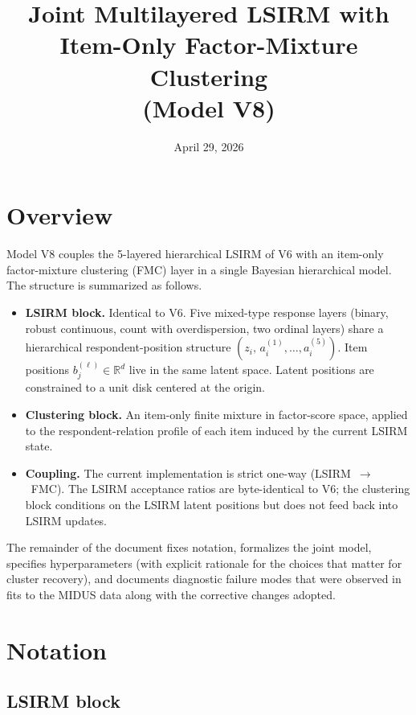 \documentclass[11pt]{article}
\title{Joint Multilayered LSIRM with Item-Only Factor-Mixture Clustering\\
(Model V8)}
\date{April 29, 2026}
\begin{document}
\maketitle

\section{Overview}

Model V8 couples the 5-layered hierarchical LSIRM of V6 with an item-only
factor-mixture clustering (FMC) layer in a single Bayesian hierarchical model.
The structure is summarized as follows.
\begin{itemize}[leftmargin=1.5em]
    \item \textbf{LSIRM block.} Identical to V6.
        Five mixed-type response layers (binary, robust continuous, count with overdispersion, two ordinal layers) share a hierarchical respondent-position structure $(z_i,\,a_i^{(1)},\dots,a_i^{(5)})$.
        Item positions $b_j^{(\ell)}\in\mathbb{R}^d$ live in the same latent space.
        Latent positions are constrained to a unit disk centered at the origin.
    \item \textbf{Clustering block.} An item-only finite mixture in factor-score
        space, applied to the respondent-relation profile of each item induced
        by the current LSIRM state.
    \item \textbf{Coupling.} The current implementation is strict one-way
        (LSIRM~$\to$~FMC). The LSIRM acceptance ratios are
        byte-identical to V6; the clustering block conditions on the LSIRM
        latent positions but does not feed back into LSIRM updates.
\end{itemize}

The remainder of the document fixes notation, formalizes the joint model,
specifies hyperparameters (with explicit rationale for the choices that
matter for cluster recovery), and documents diagnostic failure modes that
were observed in fits to the MIDUS data along with the corrective changes
adopted.

\section{Notation}

\subsection*{LSIRM block}
\end{document}
